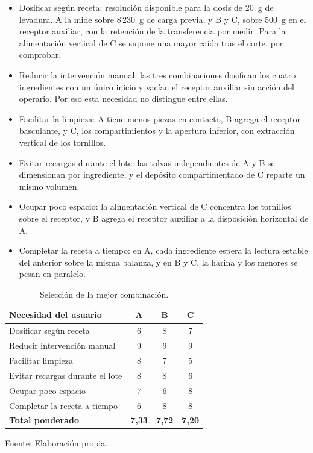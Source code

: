 \begin{itemize}
    \item Dosificar según receta: resolución disponible para la dosis de
    20~g de levadura. A la mide sobre 8\,230~g de carga previa, y B y C,
    sobre 500~g en el receptor auxiliar, con la retención de la
    transferencia por medir. Para la alimentación vertical de C se supone
    una mayor caída tras el corte, por comprobar.
    \item Reducir la intervención manual: las tres combinaciones
    dosifican los cuatro ingredientes con un único inicio y vacían el
    receptor auxiliar sin acción del operario. Por eso esta necesidad no
    distingue entre ellas.
    \item Facilitar la limpieza: A tiene menos piezas en contacto, B
    agrega el receptor basculante, y C, los compartimientos y la apertura
    inferior, con extracción vertical de los tornillos.
    \item Evitar recargas durante el lote: las tolvas independientes de A
    y B se dimensionan por ingrediente, y el depósito compartimentado de
    C reparte un mismo volumen.
    \item Ocupar poco espacio: la alimentación vertical de C concentra los
    tornillos sobre el receptor, y B agrega el receptor auxiliar a la
    disposición horizontal de A.
    \item Completar la receta a tiempo: en A, cada ingrediente espera la
    lectura estable del anterior sobre la misma balanza, y en B y C, la
    harina y los menores se pesan en paralelo.
\end{itemize}

\begin{table}[H]
    \centering
    \caption{Selección de la mejor combinación.}
    \label{tab:seleccion_combinaciones}
    \footnotesize
    \renewcommand{\arraystretch}{1.15}
    \begin{tabular}{lccc}
        \toprule
        \textbf{Necesidad del usuario} & \textbf{A} & \textbf{B} & \textbf{C} \\
        \midrule
        Dosificar según receta & 6 & 8 & 7 \\
        Reducir intervención manual & 9 & 9 & 9 \\
        Facilitar limpieza & 8 & 7 & 5 \\
        Evitar recargas durante el lote & 8 & 8 & 6 \\
        Ocupar poco espacio & 7 & 6 & 8 \\
        Completar la receta a tiempo & 6 & 8 & 8 \\
        \midrule
        \textbf{Total ponderado} & \textbf{7,33} & \textbf{7,72} & \textbf{7,20} \\
        \bottomrule
    \end{tabular}
    \par\smallskip
    Fuente: Elaboración propia.
\end{table}

